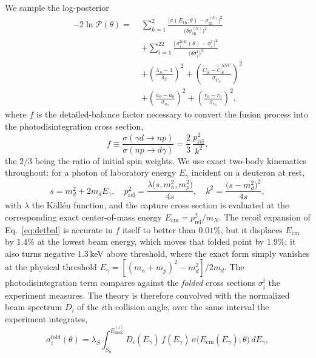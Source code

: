 \documentclass[
  aps,prd,twocolumn,nofootinbib,superscriptaddress,
  longbibliography,floatfix,preprintnumbers
]{revtex4-2}
\newcommand{\prel}{p_{\mathrm{rel}}}
\newcommand{\Egam}{E_{\gamma}}
\newcommand{\sigth}{\sigma_{\mathrm{th}}}
\newcommand{\CSv}{\tilde{C}_{S}}
\begin{document}
We sample the log-posterior
\begin{equation}
\begin{aligned}
  -2\ln\mathcal{P}(\theta)=\;
  & \sum_{k=1}^{2}\frac{\big[\sigma(E_{\mathrm{th}};\theta)-\sigth^{(k)}\big]^{2}}{\big(\delta\sigth^{(k)}\big)^{2}}\\
  & +\sum_{i=1}^{22}
    \frac{\big[\,\sigma_{i}^{\mathrm{fold}}(\theta)-\sigma_{i}^{\mathrm{f}}\,\big]^{2}}
         {\big(\delta\sigma_{i}^{\mathrm{f}}\big)^{2}}\\
  & +\left(\frac{\lambda_{S}-1}{\delta_{S}}\right)^{2}
    +\left(\frac{\CSv-\CSv^{\mathrm{ANC}}}{\sigma_{\CSv}}\right)^{2} \\
  & +\left(\frac{a_{0}-\bar a_{0}}{\sigma_{a_{0}}}\right)^{2}
    +\left(\frac{r_{0}-\bar r_{0}}{\sigma_{r_{0}}}\right)^{2},
\end{aligned}
  \label{eq:logpost}
\end{equation}
where $f$ is the detailed-balance factor necessary to convert the fusion process into the photodisintegration cross section,
\begin{equation}
f \equiv \frac{\sigma(\gamma d\to np)}{\sigma(np\to d\gamma)}
  =\frac{2}{3}\,\frac{\prel^{2}}{k^{2}},
  \label{eq:detbal}
\end{equation}
the $2/3$ being the ratio of initial spin weights.  We use exact two-body
kinematics throughout: for a photon of laboratory energy $\Egam$ incident on a
deuteron at rest,
\begin{equation}
  s=m_{d}^{2}+2m_{d}\Egam,\quad
  \prel^{2}=\frac{\lambda\big(s,m_{n}^{2},m_{p}^{2}\big)}{4s},\quad
  k^{2}=\frac{\big(s-m_{d}^{2}\big)^{2}}{4s},
  \label{eq:exactkin}
\end{equation}
with $\lambda$ the Källén function, and the capture cross section is evaluated at
the corresponding exact center-of-mass energy $E_{\mathrm{cm}}=\prel^{2}/m_{N}$.
The recoil expansion of Eq.~\eqref{eq:detbal} is accurate in $f$ itself to better
than $0.01\%$, but it displaces $E_{\mathrm{cm}}$ by $1.4\%$ at the lowest beam
energy, which moves that folded point by $1.9\%$; it also turns negative $1.3\,$keV
above threshold, where the exact form simply vanishes at the physical threshold
$\Egam=[(m_{n}+m_{p})^{2}-m_{d}^{2}]/2m_{d}$.
The photodisintegration term compares against the \emph{folded} cross sections
$\sigma_{i}^{\mathrm{f}}$ the experiment measures. The theory is therefore
convolved with the normalized beam spectrum $D_{i}$ of the $i$th collision angle, over the
same interval the experiment integrates,
\begin{equation}
  \sigma_{i}^{\mathrm{fold}}(\theta)=\lambda_{S}\!
    \int_{S_{n}}^{E_{\mathrm{max}}^{(i)}}\!\!
    D_{i}(\Egam)\,f(\Egam)\,\sigma\big(E_{\mathrm{cm}}(\Egam);\theta\big)\,d\Egam ,
  \label{eq:fold}
\end{equation}
\end{document}
